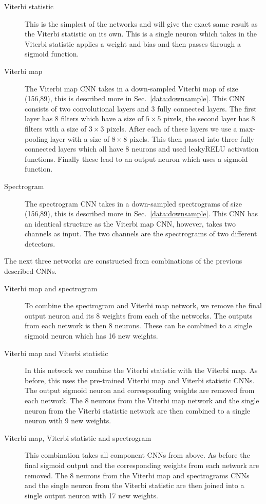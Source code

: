 \begin{description}
	\item [Viterbi statistic] This is the simplest of the networks and will
	give the exact same result as the Viterbi statistic on its own. This is a
	single neuron which takes in the Viterbi statistic applies a weight and bias
	and then passes through a sigmoid function.
	
	\item [Viterbi map] The Viterbi map \ac{CNN} takes in a down-sampled Viterbi map of size (156,89), this is described more in Sec.~\ref{data:downsample}.
	This \ac{CNN} consists of two convolutional layers and 3 fully connected layers. The first layer has
	8 filters which have a size of $5\times5$ pixels, the second layer has 8
	filters with a size of $3\times3$ pixels. After each of these layers we use a
	max-pooling layer with a size of $8\times8$ pixels. This then passed into three
	fully connected layers which all have 8 neurons and used leakyRELU activation
	functions. Finally these lead to an output neuron which uses a sigmoid
	function.
	
	\item [Spectrogram] The spectrogram \ac{CNN} takes in a down-sampled spectrograms of size (156,89), this is described more in Sec.~\ref{data:downsample}.
	This \ac{CNN} has an identical structure as the Viterbi map \ac{CNN}, however, takes two channels as input. The two channels are the spectrograms of two different detectors.
	
\end{description}

The next three networks are constructed from combinations of the previous described \acp{CNN}.

\begin{description}
	\item [Viterbi map and spectrogram] To combine the spectrogram and Viterbi map network, we remove the final output neuron and its 8 weights from each of the networks. 
	The outputs from each network is then 8 neurons. These can be combined to a single sigmoid neuron which has 16 new weights.
	
	\item [Viterbi map and Viterbi statistic] In this network we combine the
	Viterbi statistic with the Viterbi map. As before, this uses the pre-trained
	Viterbi map and Viterbi statistic \acp{CNN}. The output sigmoid neuron and corresponding weights are removed from each network. 
	The 8 neurons from the Viterbi map network and the single neuron from the Viterbi statistic network are then combined to a single neuron with 9 new weights.
	
	\item [Viterbi map, Viterbi statistic and spectrogram] This combination takes all component \acp{CNN} from above. As before the final sigmoid output and the corresponding weights from each network are removed.
	The 8 neurons from the Viterbi map and spectrograms \acp{CNN} and the single neuron from the Viterbi statistic are then joined into a single output neuron with 17 new weights. 
	
\end{description}


